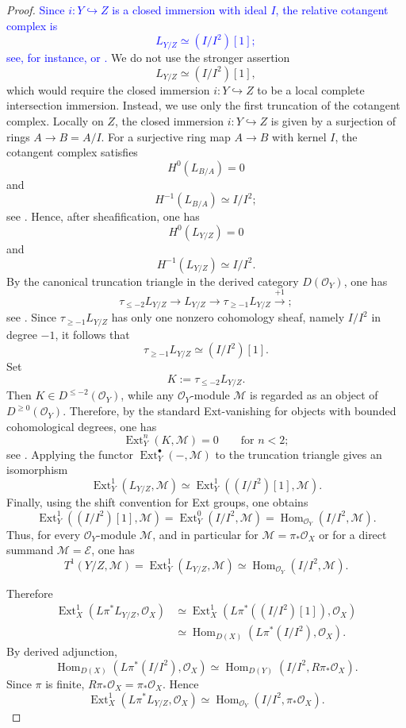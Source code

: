 \documentclass[11pt,twoside]{amsart}
\theoremstyle{plain}
\numberwithin{equation}{section}
\theoremstyle{definition}
\begin{document}
\begin{proof}
\textcolor{blue}{Since \(i:Y\hookrightarrow Z\) is a closed immersion with ideal \(I\), the
relative cotangent complex is
\[
    L_{Y/Z}\simeq (I/I^2)[1];
\]
see, for instance, \cite[Ch.~III, Proposition~2.2.4]{Illusie1971} or
\cite[Proposition~3.2.9]{Sernesi2006}.}
We do not use the stronger assertion $$L_{Y/Z}\simeq (I/I^2)[1],$$ which would require the closed immersion $i:Y\hookrightarrow Z$ to be a local complete intersection immersion. Instead, we use only the first truncation of the cotangent complex. Locally on $Z$, the closed immersion $i:Y\hookrightarrow Z$ is given by a surjection of rings $A\to B=A/I$. For a surjective ring map $A\to B$ with kernel $I$, the cotangent complex satisfies $$H^0(L_{B/A})=0$$ and $$H^{-1}(L_{B/A})\simeq I/I^2;$$ see \cite[The Cotangent Complex, Lemma~92.11.2]{stacks-project}. Hence, after sheafification, one has $$H^0(L_{Y/Z})=0$$ and $$H^{-1}(L_{Y/Z})\simeq I/I^2.$$ By the canonical truncation triangle in the derived category $D(\mathcal O_Y)$, one has
$$
\tau_{\leq -2}L_{Y/Z}
\longrightarrow
L_{Y/Z}
\longrightarrow
\tau_{\geq -1}L_{Y/Z}
\xrightarrow{+1};
$$
see \cite[Derived Categories, Remark~13.12.4]{stacks-project}. Since $\tau_{\geq -1}L_{Y/Z}$ has only one nonzero cohomology sheaf, namely $I/I^2$ in degree $-1$, it follows that
$$
\tau_{\geq -1}L_{Y/Z}\simeq (I/I^2)[1].
$$
Set $$K:=\tau_{\leq -2}L_{Y/Z}.$$ Then $K\in D^{\leq -2}(\mathcal O_Y)$, while any $\mathcal O_Y$-module $\mathcal M$ is regarded as an object of $D^{\geq 0}(\mathcal O_Y)$. Therefore, by the standard Ext-vanishing for objects with bounded cohomological degrees, one has
$$
\operatorname{Ext}^n_Y(K,\mathcal M)=0
\qquad\text{for } n<2;
$$
see \cite[Derived Categories, Lemma~13.27.3]{stacks-project}. Applying the functor $\operatorname{Ext}^{\bullet}_Y(-,\mathcal M)$ to the truncation triangle gives an isomorphism
$$
\operatorname{Ext}^1_Y(L_{Y/Z},\mathcal M)
\simeq
\operatorname{Ext}^1_Y((I/I^2)[1],\mathcal M).
$$
Finally, using the shift convention for Ext groups, one obtains
$$
\operatorname{Ext}^1_Y((I/I^2)[1],\mathcal M)
=
\operatorname{Ext}^0_Y(I/I^2,\mathcal M)
=
\operatorname{Hom}_{\mathcal O_Y}(I/I^2,\mathcal M).
$$
Thus, for every $\mathcal O_Y$-module $\mathcal M$, and in particular for $\mathcal M=\pi_*\mathcal O_X$ or for a direct summand $\mathcal M=\mathcal E$, one has
$$
T^1(Y/Z,\mathcal M)
=
\operatorname{Ext}^1_Y(L_{Y/Z},\mathcal M)
\simeq
\operatorname{Hom}_{\mathcal O_Y}(I/I^2,\mathcal M).
$$

Therefore
\[
\begin{aligned}
    \operatorname{Ext}^1_X(L\pi^*L_{Y/Z},\mathcal O_X)
    &\simeq
    \operatorname{Ext}^1_X(L\pi^*((I/I^2)[1]),\mathcal O_X)  \\
    &\simeq
    \operatorname{Hom}_{D(X)}(L\pi^*(I/I^2),\mathcal O_X).
\end{aligned}
\]
By derived adjunction,
\[
    \operatorname{Hom}_{D(X)}(L\pi^*(I/I^2),\mathcal O_X)
    \simeq
    \operatorname{Hom}_{D(Y)}(I/I^2,R\pi_*\mathcal O_X).
\]
Since \(\pi\) is finite, \(R\pi_*\mathcal O_X=\pi_*\mathcal O_X\). Hence
\[
    \operatorname{Ext}^1_X(L\pi^*L_{Y/Z},\mathcal O_X)
    \simeq
    \operatorname{Hom}_{\mathcal O_Y}(I/I^2,\pi_*\mathcal O_X).
\]


\end{proof}
\end{document}
